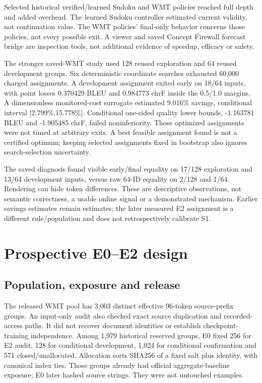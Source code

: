 \documentclass[11pt]{article}
\begin{document}
Selected historical verified/learned Sudoku and WMT policies reached full depth and added overhead. The learned Sudoku controller estimated current validity, not continuation value. The WMT policies' final-only behavior concerns those policies, not every possible exit. A viewer and saved Concept Firewall forecast bridge are inspection tools, not additional evidence of speedup, efficacy or safety.

The stronger saved-WMT study used 128 reused exploration and 64 reused development groups. Six deterministic coordinate searches exhausted 60,000 charged assignments. A development assignment exited early on 18/64 inputs, with point losses 0.370429 BLEU and 0.984773 chrF inside the 0.5/1.0 margins. A dimensionless monitored-cost surrogate estimated 9.016\% savings, conditional interval [2.799\%,15.778\%]. Conditional one-sided quality lower bounds, -1.163781 BLEU and -1.905485 chrF, failed noninferiority. Those optimized assignments were not timed at arbitrary exits. A best feasible assignment found is not a certified optimum; keeping selected assignments fixed in bootstrap also ignores search-selection uncertainty.

The saved diagnosis found visible early/final equality on 17/128 exploration and 13/64 development inputs, versus raw 64-ID equality on 2/128 and 1/64. Rendering can hide token differences. These are descriptive observations, not semantic correctness, a usable online signal or a demonstrated mechanism. Earlier savings estimates remain estimates; the later measured E2 assignment is a different rule/population and does not retrospectively calibrate S1.

\section{Prospective E0--E2 design}
\subsection{Population, exposure and release}
The released WMT pool has 3,003 distinct effective 96-token source-prefix groups. An input-only audit also checked exact source duplication and recorded-access paths. It did not recover document identities or establish checkpoint-training independence. Among 1,979 historical reserved groups, E0 fixed 256 for E2 audit, 128 for conditional development, 1,024 for conditional confirmation and 571 closed/unallocated. Allocation sorts SHA256 of a fixed salt plus identity, with canonical index ties. Those groups already had official aggregate-baseline exposure; E0 later hashed source strings. They were not untouched examples.
\end{document}
